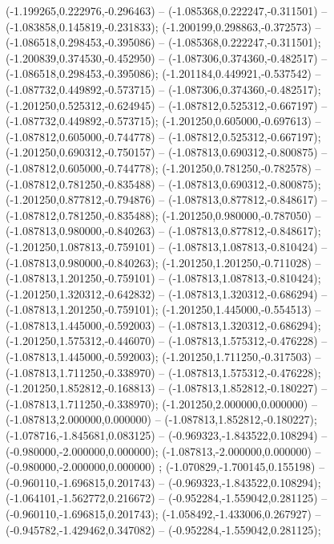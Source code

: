  (-1.199265,0.222976,-0.296463) -- (-1.085368,0.222247,-0.311501) -- (-1.083858,0.145819,-0.231833);
 (-1.200199,0.298863,-0.372573) -- (-1.086518,0.298453,-0.395086) -- (-1.085368,0.222247,-0.311501);
 (-1.200839,0.374530,-0.452950) -- (-1.087306,0.374360,-0.482517) -- (-1.086518,0.298453,-0.395086);
 (-1.201184,0.449921,-0.537542) -- (-1.087732,0.449892,-0.573715) -- (-1.087306,0.374360,-0.482517);
 (-1.201250,0.525312,-0.624945) -- (-1.087812,0.525312,-0.667197) -- (-1.087732,0.449892,-0.573715);
 (-1.201250,0.605000,-0.697613) -- (-1.087812,0.605000,-0.744778) -- (-1.087812,0.525312,-0.667197);
 (-1.201250,0.690312,-0.750157) -- (-1.087813,0.690312,-0.800875) -- (-1.087812,0.605000,-0.744778);
 (-1.201250,0.781250,-0.782578) -- (-1.087812,0.781250,-0.835488) -- (-1.087813,0.690312,-0.800875);
 (-1.201250,0.877812,-0.794876) -- (-1.087813,0.877812,-0.848617) -- (-1.087812,0.781250,-0.835488);
 (-1.201250,0.980000,-0.787050) -- (-1.087813,0.980000,-0.840263) -- (-1.087813,0.877812,-0.848617);
 (-1.201250,1.087813,-0.759101) -- (-1.087813,1.087813,-0.810424) -- (-1.087813,0.980000,-0.840263);
 (-1.201250,1.201250,-0.711028) -- (-1.087813,1.201250,-0.759101) -- (-1.087813,1.087813,-0.810424);
 (-1.201250,1.320312,-0.642832) -- (-1.087813,1.320312,-0.686294) -- (-1.087813,1.201250,-0.759101);
 (-1.201250,1.445000,-0.554513) -- (-1.087813,1.445000,-0.592003) -- (-1.087813,1.320312,-0.686294);
 (-1.201250,1.575312,-0.446070) -- (-1.087813,1.575312,-0.476228) -- (-1.087813,1.445000,-0.592003);
 (-1.201250,1.711250,-0.317503) -- (-1.087813,1.711250,-0.338970) -- (-1.087813,1.575312,-0.476228);
 (-1.201250,1.852812,-0.168813) -- (-1.087813,1.852812,-0.180227) -- (-1.087813,1.711250,-0.338970);
 (-1.201250,2.000000,0.000000) -- (-1.087813,2.000000,0.000000) -- (-1.087813,1.852812,-0.180227);
 (-1.078716,-1.845681,0.083125) -- (-0.969323,-1.843522,0.108294) -- (-0.980000,-2.000000,0.000000);
 (-1.087813,-2.000000,0.000000) -- (-0.980000,-2.000000,0.000000) ;
 (-1.070829,-1.700145,0.155198) -- (-0.960110,-1.696815,0.201743) -- (-0.969323,-1.843522,0.108294);
 (-1.064101,-1.562772,0.216672) -- (-0.952284,-1.559042,0.281125) -- (-0.960110,-1.696815,0.201743);
 (-1.058492,-1.433006,0.267927) -- (-0.945782,-1.429462,0.347082) -- (-0.952284,-1.559042,0.281125);
